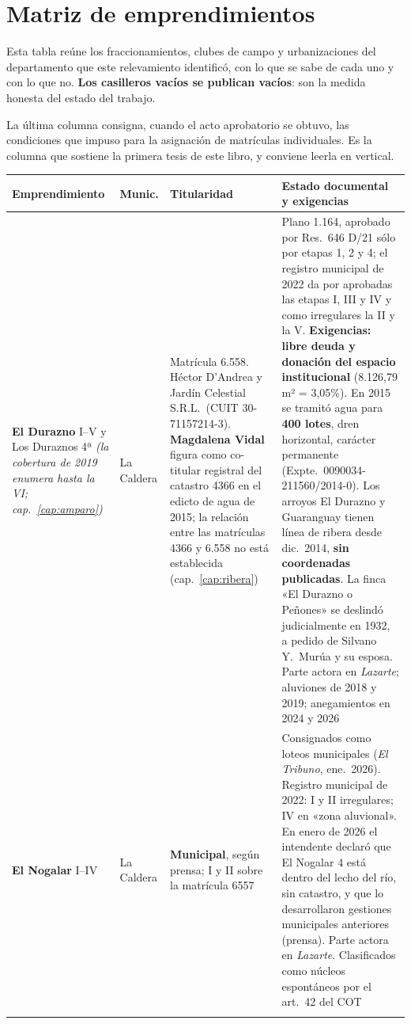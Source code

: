 \chapter{Matriz de emprendimientos}
\label{cap:matriz}

Esta tabla reúne los fraccionamientos, clubes de campo y urbanizaciones del departamento que
este relevamiento identificó, con lo que se sabe de cada uno y con lo que no. \textbf{Los
casilleros vacíos se publican vacíos}: son la medida honesta del estado del trabajo.

La última columna consigna, cuando el acto aprobatorio se obtuvo, las condiciones que impuso
para la asignación de matrículas individuales. Es la columna que sostiene la primera tesis de
este libro, y conviene leerla en vertical.

\begin{longtable}{@{}p{2.8cm}p{1.4cm}p{3.2cm}p{5.1cm}@{}}
\toprule
\textbf{Emprendimiento} & \textbf{Munic.} & \textbf{Titularidad} & \textbf{Estado documental y exigencias} \\
\midrule
\endhead

\textbf{El Durazno} I--V y Los Duraznos 4ª \textit{(la cobertura de 2019 enumera hasta la VI; cap.\ \ref{cap:amparo})} & La Caldera & Matrícula 6.558. Héctor D'Andrea\index{D'Andrea, Héctor} y Jardín Celestial S.R.L.\ (CUIT 30-71157214-3). \textbf{Magdalena Vidal\index{Vidal, Magdalena}} figura como co-titular registral del catastro 4366 en el edicto de agua de 2015; la relación entre las matrículas 4366 y 6.558 no está establecida (cap.\ \ref{cap:ribera}) & Plano 1.164, aprobado por Res.\ 646 D/21 sólo por etapas 1, 2 y 4; el registro municipal de 2022 da por aprobadas las etapas I, III y IV y como irregulares la II y la V. \textbf{Exigencias: libre deuda y donación del espacio institucional} (8.126,79 m² = 3,05\%). En 2015 se tramitó agua para \textbf{400 lotes}, dren horizontal, carácter permanente (Expte.\ 0090034-211560/2014-0). Los arroyos El Durazno y Guaranguay tienen línea de ribera desde dic.\ 2014, \textbf{sin coordenadas publicadas}. La finca «El Durazno o Peñones» se deslindó judicialmente en 1932, a pedido de Silvano Y.\ Murúa y su esposa. Parte actora en \textit{Lazarte}; aluviones de 2018 y 2019; anegamientos en 2024 y 2026 \\
\addlinespace

\textbf{El Nogalar} I--IV & La Caldera & \textbf{Municipal}, según prensa; I y II sobre la matrícula 6557 & Consignados como loteos municipales (\textit{El Tribuno}, ene.\ 2026). Registro municipal de 2022: I y II irregulares; IV en «zona aluvional». En enero de 2026 el intendente declaró que El Nogalar 4 está dentro del lecho del río, sin catastro, y que lo desarrollaron gestiones municipales anteriores (prensa). Parte actora en \textit{Lazarte}. Clasificados como núcleos espontáneos por el art.\ 42 del COT \\
\addlinespace


\end{longtable}
